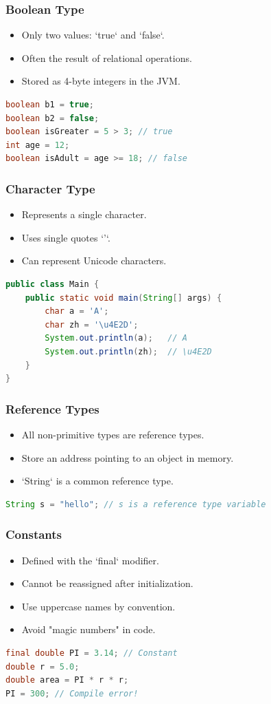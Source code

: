 \documentclass[serif, aspectratio=169]{beamer}
\begin{document}
\begin{frame}[fragile]
\frametitle{Boolean Type}
\begin{itemize}
    \item Only two values: `true` and `false`.
    \item Often the result of relational operations.
    \item Stored as 4-byte integers in the JVM.
\end{itemize}
\begin{lstlisting}[language=Java]
boolean b1 = true;
boolean b2 = false;
boolean isGreater = 5 > 3; // true
int age = 12;
boolean isAdult = age >= 18; // false
\end{lstlisting}
\end{frame}

\begin{frame}[fragile]
\frametitle{Character Type}
\begin{itemize}
    \item Represents a single character.
    \item Uses single quotes `'`.
    \item Can represent Unicode characters.
\end{itemize}
\begin{lstlisting}[language=Java]
public class Main {
    public static void main(String[] args) {
        char a = 'A';
        char zh = '\u4E2D';
        System.out.println(a);   // A
        System.out.println(zh);  // \u4E2D
    }
}
\end{lstlisting}
\end{frame}

\begin{frame}[fragile]
\frametitle{Reference Types}
\begin{itemize}
    \item All non-primitive types are reference types.
    \item Store an address pointing to an object in memory.
    \item `String` is a common reference type.
\end{itemize}
\begin{lstlisting}[language=Java]
String s = "hello"; // s is a reference type variable
\end{lstlisting}
\end{frame}

\begin{frame}[fragile]
\frametitle{Constants}
\begin{itemize}
    \item Defined with the `final` modifier.
    \item Cannot be reassigned after initialization.
    \item Use uppercase names by convention.
    \item Avoid "magic numbers" in code.
\end{itemize}
\begin{lstlisting}[language=Java]
final double PI = 3.14; // Constant
double r = 5.0;
double area = PI * r * r;
PI = 300; // Compile error!
\end{lstlisting}
\end{frame}
\end{document}
